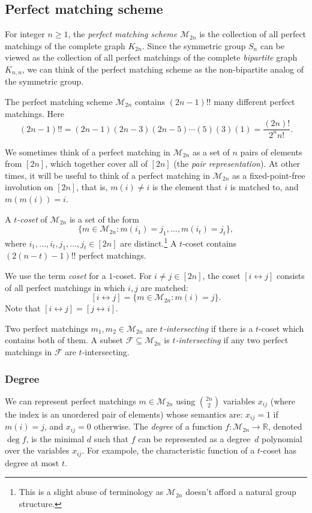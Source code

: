 \documentclass{article}
\theoremstyle{definition}
\providecommand{\dcoset}[2]{[#1 \leftrightarrow #2]}
\providecommand{\cM}{\mathcal{M}}
\begin{document}
\subsection{Perfect matching scheme} \label{sec:prel-pms}

For integer $n \ge 1$, the \emph{perfect matching scheme} $\cM_{2n}$ is the collection of all perfect matchings of the complete graph $K_{2n}$. Since the symmetric group $S_n$ can be viewed as the collection of all perfect matchings of the complete \emph{bipartite} graph $K_{n,n}$, we can think of the perfect matching scheme as the non-bipartite analog of the symmetric group.

The perfect matching scheme $\cM_{2n}$ contains $(2n-1)!!$ many different perfect matchings. Here
\[
 (2n-1)!! = (2n-1)(2n-3)(2n-5)\cdots(5)(3)(1) = \frac{(2n)!}{2^nn!}.
\]

We sometimes think of a perfect matching in $\cM_{2n}$ as a set of $n$ pairs of elements from $[2n]$, which together cover all of $[2n]$ (the \emph{pair representation}). At other times, it will be useful to think of a perfect matching in $\cM_{2n}$ as a fixed-point-free involution on $[2n]$, that is, $m(i) \neq i$ is the element that $i$ is matched to, and $m(m(i)) = i$.

A \emph{$t$-coset} of $\cM_{2n}$ is a set of the form
\[
 \{m \in \cM_{2n} : m(i_1) = j_1, \ldots, m(i_t) = j_t\},
\]
where $i_1,\ldots,i_t,j_1,\ldots,j_t \in [2n]$ are distinct.\footnote{This is a slight abuse of terminology as $\cM_{2n}$ doesn't afford a natural group structure.} 
A $t$-coset contains $(2(n-t)-1)!!$ perfect matchings.

We use the term \emph{coset} for a $1$-coset. For $i \neq j \in [2n]$, the coset $\dcoset{i}{j}$ consists of all perfect matchings in which $i,j$ are matched:
\[
 \dcoset{i}{j} = \{m \in \cM_{2n} : m(i) = j\}.
\]
Note that $\dcoset{i}{j} = \dcoset{j}{i}$.

Two perfect matchings $m_1,m_2 \in \cM_{2n}$ are \emph{$t$-intersecting} if there is a $t$-coset which contains both of them. A subset $\mathcal{F} \subseteq \cM_{2n}$ is \emph{$t$-intersecting} if any two perfect matchings in $\mathcal{F}$ are $t$-intersecting.

\subsubsection{Degree} \label{sec:degree-pms}

We can represent perfect matchings $m \in \cM_{2n}$ using $\binom{2n}{2}$ variables $x_{ij}$ (where the index is an unordered pair of elements) whose semantics are: $x_{ij} = 1$ if $m(i) = j$, and $x_{ij} = 0$ otherwise. The \emph{degree} of a function $f\colon \cM_{2n} \to \mathbb{R}$, denoted $\deg f$, is the minimal $d$ such that $f$ can be represented as a degree~$d$ polynomial over the variables $x_{ij}$. For exampole, the characteristic function of a $t$-coset has degree at most $t$.
\end{document}
